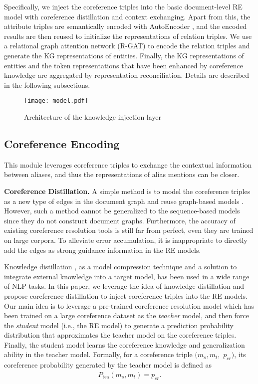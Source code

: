 \documentclass[runningheads]{llncs}
\begin{document}
Specifically, we inject the coreference triples into the basic document-level RE model with coreference distillation and context exchanging. 
Apart from this, the attribute triples are semantically encoded with AutoEncoder \cite{rumelhart1986learning}, and the encoded results are then reused to initialize the representations of relation triples.
We use a relational graph attention network (R-GAT) \cite{busbrige2019relational} to encode the relation triples and generate the KG representations of entities.
Finally, the KG representations of entities and the token representations that have been enhanced by coreference knowledge are aggregated by representation reconciliation. 
Details are described in the following subsections.

\begin{figure}[!tb]
	\centering
	\texttt{[image: model.pdf]}
	\caption{Architecture of the knowledge injection layer}
	\label{fig:model}
\end{figure}

\subsection{Coreference Encoding}
This module leverages coreference triples to exchange the contextual information between aliases, and thus the representations of alias mentions can be closer. 

\textbf{Coreference Distillation.}
A simple method is to model the coreference triples as a new type of edges in the document graph and reuse graph-based models \cite{nan2020reasoning,peng2017cross,verga2018simultaneously}.
However, such a method cannot be generalized to the sequence-based models since they do not construct document graphs.
Furthermore, the accuracy of existing coreference resolution tools is still far from perfect, even they are trained on large corpora. 
To alleviate error accumulation, it is inappropriate to directly add the edges as strong guidance information in the RE models.

Knowledge distillation \cite{hinton2015distilling,tong2020improving}, as a model compression technique and a solution to integrate external knowledge into a target model, has been used in a wide range of NLP tasks. 
In this paper, we leverage the idea of knowledge distillation and propose coreference distillation to inject coreference triples into the RE models.
Our main idea is to leverage a pre-trained coreference resolution model which has been trained on a large coreference dataset as the \emph{teacher} model, and then force the \emph{student} model (i.e., the RE model) to generate a prediction probability distribution that approximates the teacher model on the coreference triples.
Finally, the student model learns the coreference knowledge and generalization ability in the teacher model.
Formally, for a coreference triple $(m_s,m_t,$ $p_{cr})$, its coreference probability generated by the teacher model is defined as
\begin{align}
	P_\text{tea}(m_s,m_t) = p_{cr}.
\end{align}
\end{document}
